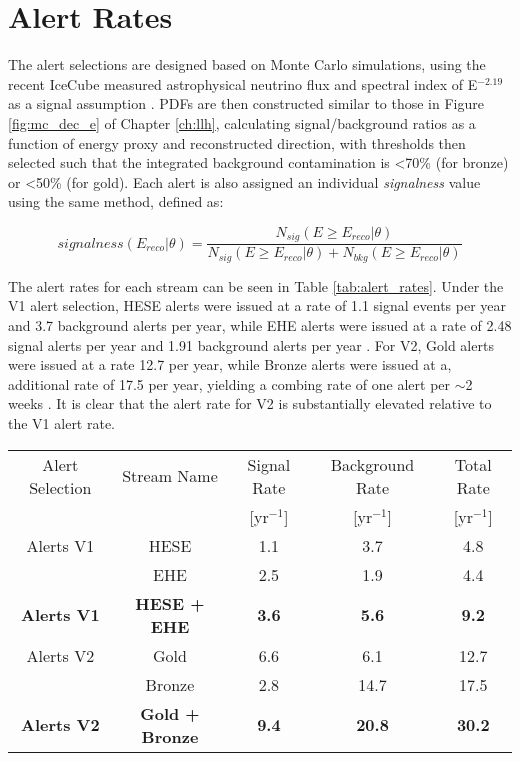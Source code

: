 \section{Alert Rates}
The alert selections are designed based on Monte Carlo simulations, using the recent IceCube measured astrophysical neutrino flux and spectral index of E$^{-2.19}$ as a signal assumption . PDFs are then constructed similar to those in Figure \ref{fig:mc_dec_e} of Chapter \ref{ch:llh}, calculating signal/background ratios as a function of energy proxy and reconstructed direction, with thresholds then selected such that the integrated background contamination is <70\% (for bronze) or <50\% (for gold). Each alert is also assigned an individual \emph{signalness} value using the same method, defined as:

\begin{equation}
	signalness(E_{reco}|\theta) = \frac{N_{sig} (E \geq E_{reco}|\theta)}{N_{sig}(E \geq E_{reco}|\theta) + N_{bkg}(E \geq E_{reco}|\theta)}
\end{equation}

The alert rates for each stream can be seen in Table \ref{tab:alert_rates}. Under the V1 alert selection, HESE alerts were issued at a rate of 1.1 signal events per year and 3.7 background alerts per year, while EHE alerts were issued at a rate of 2.48 signal alerts per year and 1.91 background alerts per year \cite{ic_realtime_17}. For V2, Gold alerts were issued at a rate 12.7 per year, while Bronze alerts were issued at a, additional rate of 17.5 per year, yielding a combing rate of one alert per $\sim$2 weeks \cite{ic_realtime_19}. It is clear that the alert rate for V2 is substantially elevated relative to the V1 alert rate.

 \begin{table*}
	\centering
	\begin{tabular}{||c |c |c c| c ||} 
		\hline
		Alert Selection & Stream Name &Signal Rate& Background Rate& Total Rate \\
		& &[yr$^{-1}$]& [yr$^{-1}$]&[yr$^{-1}$]\\
		\hline
		Alerts V1 & HESE & 1.1 & 3.7 & 4.8\\
		& EHE & 2.5 & 1.9 & 4.4\\
		\hline 
		\textbf{Alerts V1}& \textbf{HESE + EHE} & \textbf{3.6} & \textbf{5.6} & \textbf{9.2}\\
		\hline 
		Alerts V2 & Gold & 6.6 & 6.1& 12.7\\
		& Bronze & 2.8 & 14.7& 17.5\\
		\hline 
		\textbf{Alerts V2} & \textbf{Gold + Bronze} & \textbf{9.4} & \textbf{20.8} & \textbf{30.2} \\
		\hline \hline
	\end{tabular}
	\caption{IceCube realtime alert rates.}
	\label{tab:alert_rates}
\end{table*}

